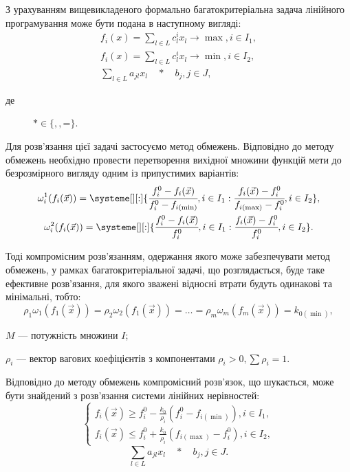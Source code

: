 З урахуванням вищевикладеного формально багатокритеріальна задача лінійного програмування може бути подана в наступному вигляді:
\begin{gather*}
	f_i(x) = \sum_{l \in L}{c_l^i x_l} \to \max, i \in I_1, \\
	f_i(x) = \sum_{l \in L}{c_l^i x_l} \to \min, i \in I_2, \\
	\sum_{l \in L}{a_{jl} x_l \quad * \quad b_j}, j \in J,
\end{gather*}
\begin{description}
	\item[де] $* \in \{$\leq$, $\geq$, $=$\}$.
\end{description}

Для розв'язання цієї задачі застосуємо метод обмежень. 
Відповідно до методу обмежень необхідно провести перетворення вихідної множини функцій мети до безрозмірного вигляду одним із припустимих варіантів:
\begin{gather*}
\omega^1_i(f_i(\vec{x})) = \systeme[][:]{
\cfrac{f_i^0-f_i(\vec{x})}{f_i^0 - f_{i(\min)}},i \in I_1
:
\cfrac{f_i(\vec{x})-f_i^0}{f_{i(\max)} - f_i^0},i \in I_2
}
, \\
\omega^2_i(f_i(\vec{x})) = \systeme[][:]{
\cfrac{f_i^0-f_i(\vec{x})}{f_i^0},i \in I_1
:
\cfrac{f_i(\vec{x})-f_i^0}{f_i^0},i \in I_2
}
.
\end{gather*}

Тоді компромісним розв'язанням, одержання якого може забезпечувати метод обмежень, у рамках багатокритеріальної задачі, що розглядається, буде таке ефективне розв'язання, для якого зважені відносні втрати будуть одинакові та мінімальні, тобто:
\[
\rho_1 \omega_1 (f_1(\vec{x})) = \rho_2 \omega_2 (f_1(\vec{x})) = \ldots = \rho_m \omega_m (f_m(\vec{x})) = k_{0 (\min)},
\]
\begin{description}
	\item[де] $M$ --- потужність множини $I$; 
	\item $\rho_i$ --- вектор вагових коефіцієнтів з компонентами $\rho_i > 0, \sum{\rho_i} = 1$.
\end{description}

Відповідно до методу обмежень компромісний розв'язок, що шукається, може бути знайдений з розв'язання системи лінійних нерівностей:
\begin{equation}\label{eq:system}
	\begin{cases}
	f_i(\vec{x}) \geq f_{i}^0 - \frac{k_0}{\rho_i}(f_{i}^0 - f_{i(\min)}) , i \in I_1, \\
	f_i(\vec{x}) \leq f_{i}^0 + \frac{k_0}{\rho_i}(f_{i(\max)} - f_{i}^0 ), i \in I_2,
	\end{cases}
\end{equation}
\[
	\sum_{l \in L}{a_{jl} x_l \quad * \quad b_j}, j \in J.
\]

